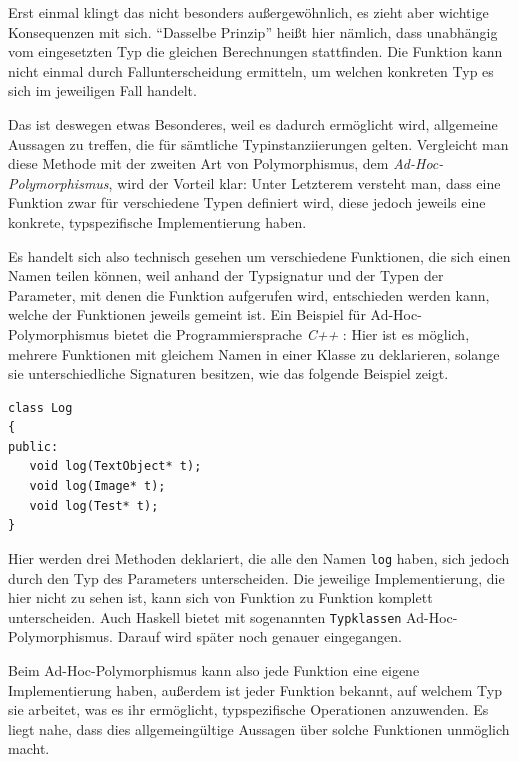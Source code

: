 Erst einmal klingt das nicht besonders außergewöhnlich, es zieht aber wichtige
Konsequenzen mit sich. ``Dasselbe Prinzip'' heißt hier nämlich, dass unabhängig vom eingesetzten Typ die gleichen
Berechnungen stattfinden. Die Funktion kann nicht einmal
durch Fallunterscheidung ermitteln, um welchen konkreten Typ es sich im jeweiligen Fall handelt.

Das ist deswegen etwas Besonderes, weil es dadurch ermöglicht wird, allgemeine Aussagen zu treffen, die für sämtliche
Typinstanziierungen gelten. Vergleicht man diese Methode mit der zweiten Art von Polymorphismus, dem \textit{Ad-Hoc-Polymorphismus},
wird der Vorteil klar: Unter Letzterem versteht man, dass eine Funktion zwar für verschiedene Typen definiert wird, diese jedoch
jeweils eine konkrete, typspezifische Implementierung haben.

Es handelt sich also technisch gesehen um verschiedene Funktionen, die sich einen Namen teilen können, weil anhand der Typsignatur
und der Typen der Parameter, mit denen die Funktion aufgerufen wird, entschieden werden kann, welche der Funktionen jeweils gemeint ist.
Ein Beispiel für Ad-Hoc-Polymorphismus bietet die Programmiersprache \textit{C++} : Hier ist es möglich, mehrere Funktionen mit gleichem
Namen in einer Klasse zu deklarieren, solange sie unterschiedliche Signaturen besitzen, wie das folgende Beispiel zeigt.

\begin{verbatim}
class Log
{
public:
   void log(TextObject* t);
   void log(Image* t);
   void log(Test* t);
}
\end{verbatim}

Hier werden drei Methoden deklariert, die alle den Namen \texttt{log} haben, sich jedoch durch den Typ des Parameters
unterscheiden. Die jeweilige Implementierung, die hier nicht zu sehen ist, kann sich von Funktion zu Funktion komplett unterscheiden.
Auch Haskell bietet mit sogenannten \texttt{Typklassen} Ad-Hoc-Polymorphismus. Darauf wird später noch genauer eingegangen.

Beim Ad-Hoc-Polymorphismus kann also jede Funktion eine eigene Implementierung haben, außerdem ist jeder Funktion
bekannt, auf welchem Typ sie arbeitet, was es ihr ermöglicht, typspezifische Operationen anzuwenden. Es liegt nahe, dass dies
allgemeingültige Aussagen über solche Funktionen unmöglich macht.

